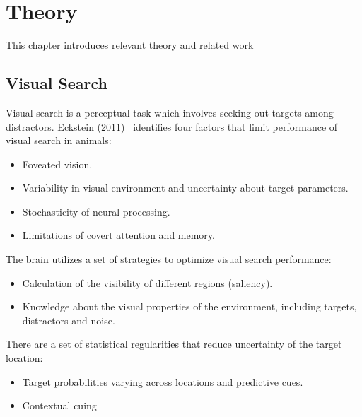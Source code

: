 \chapter{Theory}
\label{cha:theory}

This chapter introduces relevant theory and related work 


\section{Visual Search}


Visual search is a perceptual task which involves seeking out targets among distractors. Eckstein (2011)~\cite{eckstein_visual_2011} identifies four factors that limit performance of visual search in animals:

\begin{itemize}
    \item Foveated vision.
    \item Variability in visual environment and uncertainty about target parameters.
    \item Stochasticity of neural processing.
    \item Limitations of covert attention and memory.
\end{itemize}

The brain utilizes a set of strategies to optimize visual search performance:

\begin{itemize}
    \item Calculation of the visibility of different regions (saliency).
    \item Knowledge about the visual properties of the environment, including targets, distractors and noise.
\end{itemize}

There are a set of statistical regularities that reduce uncertainty of the target location:

\begin{itemize}
    \item Target probabilities varying across locations and predictive cues.
    \item Contextual cuing
\end{itemize}


